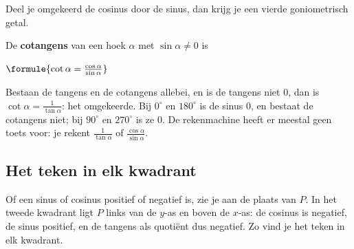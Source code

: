 Deel je omgekeerd de cosinus door de sinus, dan krijg je een vierde goniometrisch getal.

\begin{theorie}
De \textbf{\textcolor{accent}{cotangens}} van een hoek $\alpha$ met $\sin\alpha \neq 0$ is

\vspace{1mm}
\qquad $\formule{\cot\alpha = \frac{\cos\alpha}{\sin\alpha}}$
\end{theorie}

Bestaan de tangens en de cotangens allebei, en is de tangens niet 0, dan is $\cot\alpha = \frac{1}{\tan\alpha}$: het omgekeerde. Bij $0^\circ$ en $180^\circ$ is de sinus 0, en bestaat de cotangens niet; bij $90^\circ$ en $270^\circ$ is ze 0. De rekenmachine heeft er meestal geen toets voor: je rekent $\frac{1}{\tan\alpha}$ of $\frac{\cos\alpha}{\sin\alpha}$.


\begin{oefeningen}
\end{oefeningen}

\subsection{Het teken in elk kwadrant}

Of een sinus of cosinus positief of negatief is, zie je aan de plaats van $P$. In het tweede kwadrant ligt $P$ links van de $y$-as en boven de $x$-as: de cosinus is negatief, de sinus positief, en de tangens als quotiënt dus negatief. Zo vind je het teken in elk kwadrant.

